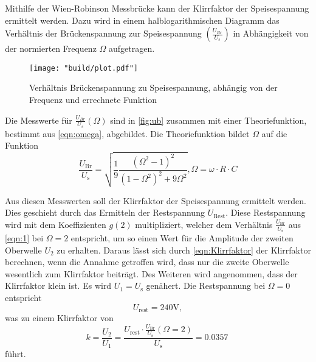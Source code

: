 \noindent Mithilfe der Wien-Robinson Messbrücke kann der Klirrfaktor der Speisespannung 
ermittelt werden. Dazu wird in einem halblogarithmischen Diagramm das
Verhältnis der Brückenspannung zur Speisespannung $(\frac{U_{Br}}{U_s})$ in 
Abhängigkeit von der normierten Frequenz $\Omega$ aufgetragen.
\begin{figure}[H]
       \caption{Verhältnis Brückenspannung zu Speisespannung, abhängig von der Frequenz und errechnete Funktion}
       \label{fig:ub}
       \centering
       \texttt{[image: "build/plot.pdf"]}
\end{figure}
\noindent Die Messwerte für $\frac{U_{Br}}{U_s}\left(\Omega\right)$ sind in
\autoref{fig:ub} zusammen mit einer Theoriefunktion, bestimmt aus
\autoref{eqn:omega}, abgebildet. Die Theoriefunktion bildet $\Omega$ auf die Funktion
\begin{equation}
       \frac{U_\text{Br}}{U_\text{s}} = \sqrt{\frac{1}{9} \frac{\left(\Omega^2-1\right)^2}{\left(1-\Omega^2\right)^2+9\Omega^2}} , \Omega = \omega \cdot R \cdot C
\end{equation}

\noindent Aus diesen Messwerten soll der Klirrfaktor der Speisespannung ermittelt werden. 
Dies geschieht durch das Ermitteln der Restspannung $U_\text{Rest}$. Diese 
Restspannung wird mit dem Koeffizienten $g(2)$ multipliziert, welcher dem 
Verhältnis $\frac{U_\text{Br}}{U_\text{s}}$ aus \autoref{eqn:1} bei $\Omega = 2$ entspricht, um so 
einen Wert für die Amplitude der zweiten Oberwelle $U_2$ zu erhalten.
Daraus lässt sich durch \autoref{eqn:Klirrfaktor} der Klirrfaktor berechnen,
wenn die Annahme getroffen wird, dass nur die zweite Oberwelle wesentlich zum
Klirrfaktor beiträgt. Des Weiteren wird angenommen, dass der Klirrfaktor klein
ist. Es wird  $U_1 = U_\text{s}$ genähert.
Die Restspannung bei $\Omega = 0 $ entspricht 
\begin{equation*}
       U_\text{rest} = 240 \unit{\volt},
\end{equation*}
was zu einem Klirrfaktor von 
\begin{equation*}
       k = \frac{U_2}{U_1} = \frac{U_\text{rest} \cdot \frac{U_\text{Br}}{U_\text{s}}(\Omega = 2)}{U_\text{s}} = \qty{0.0357}{}
\end{equation*}
führt.